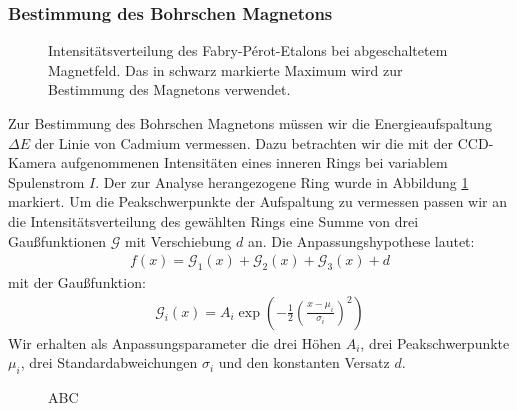 \documentclass[11pt, a4paper]{article}
\begin{document}
\subsubsection{Bestimmung des Bohrschen Magnetons}
\begin{figure}[h]
	\centering
	
	\caption{Intensitätsverteilung des Fabry-Pérot-Etalons bei abgeschaltetem Magnetfeld. Das in schwarz markierte Maximum wird zur Bestimmung des Magnetons verwendet.}
	\label{fig:peakauswahl}
\end{figure}
Zur Bestimmung des Bohrschen Magnetons müssen wir die Energieaufspaltung $\Delta E$ der Linie von Cadmium vermessen.
Dazu betrachten wir die mit der CCD-Kamera aufgenommenen Intensitäten eines inneren Rings bei variablem Spulenstrom $I$.
Der zur Analyse herangezogene Ring wurde in Abbildung \ref{fig:peakauswahl} markiert.
Um die Peakschwerpunkte der Aufspaltung zu vermessen passen wir an die Intensitätsverteilung des gewählten Rings eine Summe von drei Gaußfunktionen $\mathcal{G}$ mit Verschiebung $d$ an.
Die Anpassungshypothese lautet:
\begin{align}
f(x) = \mathcal{G}_1(x) + \mathcal{G}_2(x) + \mathcal{G}_3(x) + d
\end{align}
mit der Gaußfunktion:
\begin{align}
\mathcal{G}_i(x) = A_i \exp\left( -\frac{1}{2} \left( \frac{x - \mu_i}{\sigma_i} \right)^2 \right)
\end{align}
Wir erhalten als Anpassungsparameter die drei Höhen $A_i$, drei Peakschwerpunkte $\mu_i$, drei Standardabweichungen $\sigma_i$ und den konstanten Versatz $d$.

\begin{figure}
	\centering
	
	\caption{ABC}
	\label{fig:zeeman_b4_bsp}
\end{figure}
\end{document}
